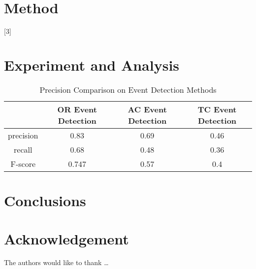\section{Method} \label{sec-method}

\blindtext
{}[3]
\blinditemize
\blindenumerate

\blindmathtrue
\blindmathfalse
\blinddescription

\qwuMarker %

\section{Experiment and Analysis} \label{sec-experiment}


\begin{table}  \centering
  \caption{Precision Comparison on Event Detection Methods}
  \label{tbl:overall-experiments}
  \begin{tabular}{cccc}
\toprule
    & OR Event Detection & AC Event Detection & TC Event Detection \\
\midrule
    precision & 0.83 & 0.69 & 0.46 \\
    recall & 0.68 & 0.48 & 0.36 \\
    F-score & 0.747 & 0.57 & 0.4 \\
\bottomrule
\end{tabular}
\end{table}


\section{Conclusions} \label{sec-conclusions}

\blindtext

\section*{Acknowledgement}

\lipsum[1]


The authors would like to thank \ldots

